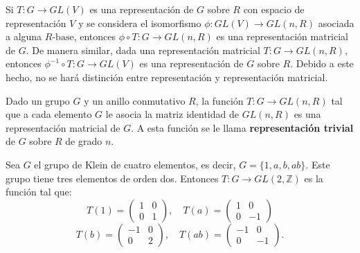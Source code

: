 Si $T \colon G \to GL(V)$ es una representación de $G$ sobre $R$ con espacio de representación $V$ y se considera el isomorfismo $\phi \colon GL(V) \to GL(n,R)$ asociada a alguna $R\mbox{-base}$, entonces $\phi \circ T \colon G \to GL(n, R)$ es una representación matricial de $G$. De manera similar, dada una representación matricial $T \colon G \to GL(n,R)$, entonces $\phi^{-1}\circ T \colon G \to GL(V)$ es una representación de $G$ sobre $R$. Debido a este hecho, no se hará distinción entre representación y representación matricial.
\begin{ejemplo}
Dado un grupo $G$ y un anillo conmutativo $R$, la función $T \colon G \to GL(n,R)$ tal que a cada elemento $G$ le asocia la matriz identidad de $GL(n,R)$ es una representación matricial de $G$. A esta función  se le llama \textbf{representación trivial} de $G$ sobre $R$ de grado $n$. 
\end{ejemplo}
\begin{ejemplo}
Sea $G$ el grupo de Klein de cuatro elementos, es  decir, $G = \{ 1, a, b, ab\}$. Este grupo tiene tres elementos de orden dos. Entonces $T \colon G \to GL(2, \mathds{Z})$ es la función tal que:
\begin{equation*} T(1) = \begin{pmatrix}
1 & 0 \\
0 & 1
\end{pmatrix}, \quad T(a) = \begin{pmatrix}
1 & 0 \\
0 & -1
\end{pmatrix} \end{equation*}
\begin{equation*} T(b) = \begin{pmatrix}
-1 & 0 \\
0 & 2
\end{pmatrix}, \quad T(ab) = \begin{pmatrix}
-1 & 0 \\
0 & -1
\end{pmatrix}. \end{equation*}
\end{ejemplo}
